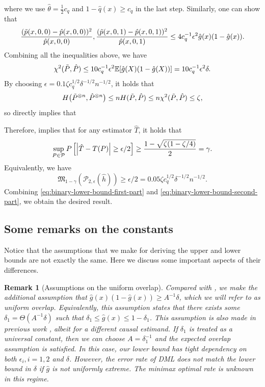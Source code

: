 \documentclass{article}
\def\eps{{\epsilon}}
\def\gP{{\mathcal{P}}}
\newcommand{\E}{\mathbb{E}}
\newtheorem{remark}{Remark}[section]
\begin{document}
where we use $\hat{\theta}=\frac{1}{2}c_q$ and $1-\hat{q}(x)\geq c_q$ in the last step.
Similarly, one can show that
\begin{equation}
    \notag
    \frac{(\tilde{p}(x,0,0)-\hat{p}(x,0,0))^2}{\hat{p}(x,0,0)}, \frac{(\tilde{p}(x,0,1)-\hat{p}(x,0,1))^2}{\hat{p}(x,0,1)} \leq 4c_q^{-1}\eps^2 \hat{g}(x)(1-\hat{g}(x)).
\end{equation}
Combining all the inequalities above, we have
\begin{equation}
    \notag
    \chi^2(\tilde{P},\hat{P})\leq 10c_q^{-1}\eps^2 \E[\hat{g}(X)(1-\hat{g}(X))] = 10c_q^{-1}\eps^2\delta.
\end{equation}
By choosing $\eps = 0.1\zeta c_q^{1/2}\delta^{-1/2}n^{-1/2}$, it holds that
\begin{equation}
    \notag
    H\big(\tilde{P}^{\otimes n}, \hat{P}^{\otimes n}\big) \leq n H(\tilde{P},\hat{P}) \leq n \chi^2(\tilde{P},\hat{P}) \leq\zeta,
\end{equation}
so  directly implies that

Therefore,   implies that for any estimator $\hat{T}$, it holds that
\begin{equation}
    \notag
    \sup_{P\in\gP} P\left[ \left|\hat{T}-T(P)\right|\geq \eps/2 \right] \geq \frac{1-\sqrt{\zeta(1-\zeta / 4)}}{2} = \gamma.
\end{equation}
Equivalently, we have 
\begin{equation}
    \label{eq:binary-lower-bound-second-part}
    \mathfrak{M}_{1-\gamma}\left(\gP_{2,\eps}(\hat{h})\right) \geq \eps/2 = 0.05\zeta c_q^{1/2}\delta^{-1/2}n^{-1/2}.
\end{equation}
Combining \eqref{eq:binary-lower-bound-first-part} and \eqref{eq:binary-lower-bound-second-part}, we obtain the desired result.

\subsection{Some remarks on the constants}
Notice that the assumptions that we make for deriving the upper and lower bounds are not exactly the same. Here we discuss some important aspects of their differences.

\begin{remark}[Assumptions on the uniform overlap]
Compared with , we make the additional assumption that $\hat{g}(x)(1-\hat{g}(x)) \geq A^{-1}\delta$, which we will refer to as \textit{uniform overlap}. Equivalently, this assumption states that there exists some $\delta_1=\Theta(A^{-1}\delta)$ such that $\delta_1 \leq\hat{g}(x)\leq 1-\delta_1$. This assumption is also made in previous work \citep{jin2024structure}, albeit for a different causal estimand. If $\delta_1$ is treated as a universal constant, then we can choose $A=\delta_1^{-1}$ and the expected overlap assumption is satisfied. In this case, our lower bound has tight dependency on both $\eps_i,i=1,2$ and $\delta$. However, the error rate of DML does not match the lower bound in $\delta$ if $\hat{g}$ is not uniformly extreme. The minimax optimal rate is unknown in this regime.
\end{remark}
\end{document}
